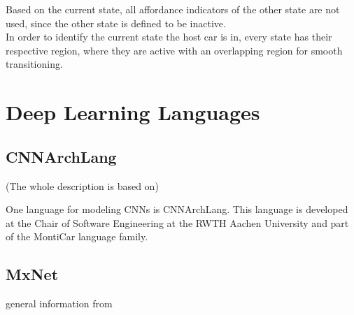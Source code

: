 Based on the current state, all affordance indicators of the other state are not used, since the other state is defined to be inactive.\\
In order to identify the current state the host car is in, every state has their respective region, where they are active with an overlapping region for smooth transitioning.





\section{Deep Learning Languages}\label{sec: DLL}

\subsection{CNNArchLang}\label{subsec: CNNArch}

(The whole description is based on\cite{CNNArch})

One language for modeling CNNs is CNNArchLang. This language is developed at the Chair of Software Engineering at the RWTH Aachen University and part of the MontiCar language family. 














\subsection{MxNet}\label{subsec: MxNet}

general information from \cite{chen2015mxnet}

